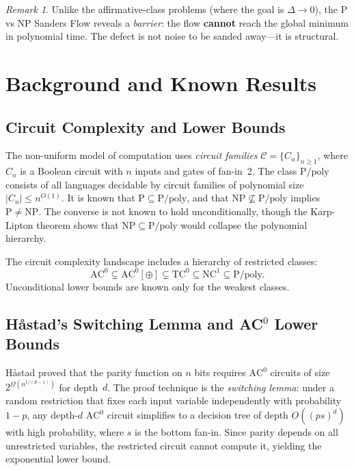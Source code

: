 \documentclass[11pt]{article}
\theoremstyle{definition}
\theoremstyle{remark}
\newtheorem{remark}[theorem]{Remark}
\newcommand{\calC}{\mathcal{C}}
\newcommand{\Ppoly}{\mathrm{P/poly}}
\newcommand{\ACz}{\mathrm{AC}^0}
\newcommand{\NCone}{\mathrm{NC}^1}
\newcommand{\TCz}{\mathrm{TC}^0}
\begin{document}
\begin{remark}
Unlike the affirmative-class problems (where the goal is $\Delta \to 0$),
the P vs NP Sanders Flow reveals a \emph{barrier}: the flow \textbf{cannot}
reach the global minimum in polynomial time. The defect is not noise to be
sanded away---it is structural.
\end{remark}

\section{Background and Known Results}
\label{sec:background}

\subsection{Circuit Complexity and Lower Bounds}

The non-uniform model of computation uses \emph{circuit families}
$\calC = \{C_n\}_{n \geq 1}$, where $C_n$ is a Boolean circuit with
$n$ inputs and gates of fan-in~2.  The class $\Ppoly$ consists of all
languages decidable by circuit families of polynomial size $|C_n| \leq n^{O(1)}$.
It is known that $\mathrm{P} \subseteq \Ppoly$, and that
$\mathrm{NP} \not\subseteq \Ppoly$ implies $\mathrm{P} \neq \mathrm{NP}$.
The converse is not known to hold unconditionally, though the
Karp-Lipton theorem \cite{KL} shows that $\mathrm{NP} \subseteq \Ppoly$
would collapse the polynomial hierarchy.

The circuit complexity landscape includes a hierarchy of restricted
classes:
\[
  \ACz \subsetneq \ACz[\oplus] \subsetneq \TCz \subseteq \NCone \subseteq \Ppoly.
\]
Unconditional lower bounds are known only for the weakest classes.

\subsection{H\aa stad's Switching Lemma and AC$^0$ Lower Bounds}

H\aa stad \cite{Hastad} proved that the parity function on $n$ bits
requires $\ACz$ circuits of size $2^{\Omega(n^{1/(d-1)})}$ for depth~$d$.
The proof technique is the \emph{switching lemma}: under a random restriction
that fixes each input variable independently with probability $1-p$,
any depth-$d$ $\ACz$ circuit simplifies to a decision tree of depth
$O((ps)^d)$ with high probability, where $s$ is the bottom fan-in.
Since parity depends on all unrestricted variables, the restricted circuit
cannot compute it, yielding the exponential lower bound.
\end{document}

